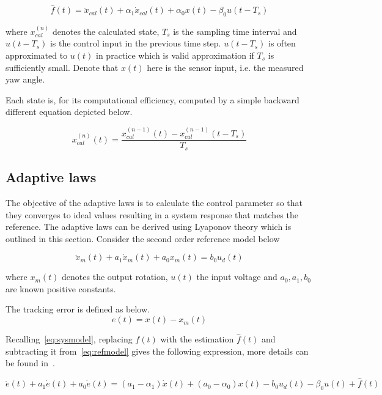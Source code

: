 \begin{equation}
  \label{eq:perturbation}
  \hat{f}(t) = \ddot{x}_{cal}(t) + \alpha_1\dot{x}_{cal}(t) +  \alpha_0x(t) - \beta_0u(t-T_s)
\end{equation}

where $x_{cal}^{(n)}$ denotes the calculated state, $T_s$ is the sampling time interval and $u(t-T_s)$ is the control input in the previous time step. $u(t-T_s)$ is often approximated to $u(t)$ in practice which is valid approximation if $T_s$ is sufficiently small. Denote that $x(t)$ here is the sensor input, i.e. the measured yaw angle.

Each state is, for its computational efficiency, computed by a simple backward different equation depicted below.

\begin{equation}
  \label{eq:backward}
  x_{cal}^{(n)}(t) = \frac{x_{cal}^{(n-1)}(t) - x_{cal}^{(n-1)}(t-T_s)}{T_s}
\end{equation}

\subsection{Adaptive laws}
The objective of the adaptive laws is to calculate the control parameter so that they converges to ideal values resulting in a system response that matches the reference. The adaptive laws can be derived using Lyaponov theory which is outlined in this section. Consider the second order reference model below

\begin{equation}
  \label{eq:refmodel}
  \ddot{x}_m(t) + a_1\dot{x}_m(t) +  a_0x_m(t) = b_0u_d(t)
\end{equation}

where $x_m(t)$ denotes the output rotation, $u(t)$ the input voltage and $a_0, a_1, b_0$ are known positive constants.

The tracking error is defined as below.
\begin{equation}
  \label{eq:stateerror}
  e(t) = x(t) - x_m(t)
\end{equation}

Recalling~\eqref{eq:sysmodel}, replacing $f(t)$ with the estimation $\hat{f}(t)$ and subtracting it from~\eqref{eq:refmodel} gives the following expression, more details can be found in~\cite{Qingson:2016}.

\begin{equation}
  \ddot{e}(t) + a_1\dot{e}(t) + a_0\dot{e}(t) =  (a_1-\alpha_1)\dot{x}(t) + (a_0-\alpha_0)x(t) - b_0u_d(t) - \beta_0u(t) + \hat{f}(t)
\end{equation}

